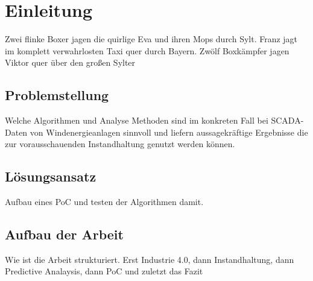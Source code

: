 \section{Einleitung}
Zwei flinke Boxer jagen die quirlige Eva und ihren Mops durch Sylt. Franz jagt im komplett verwahrlosten Taxi quer durch Bayern. Zwölf Boxkämpfer jagen Viktor quer über den großen Sylter

\subsection{Problemstellung}
Welche Algorithmen und Analyse Methoden sind im konkreten Fall bei SCADA-Daten von Windenergieanlagen sinnvoll und liefern aussagekräftige Ergebnisse die zur vorausschauenden Instandhaltung genutzt werden können.

\subsection{Lösungsansatz}
Aufbau eines PoC und testen der Algorithmen damit.

\subsection{Aufbau der Arbeit}
Wie ist die Arbeit strukturiert. Erst Industrie 4.0, dann Instandhaltung, dann Predictive Analaysis, dann PoC und zuletzt das Fazit

\newpage
